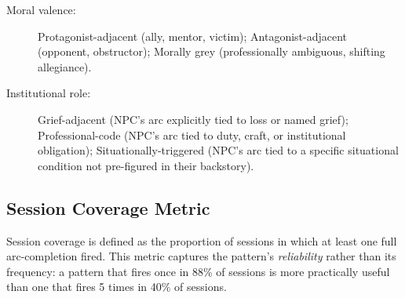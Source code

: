 \begin{description}
  \item[Moral valence:] Protagonist-adjacent (ally, mentor, victim); Antagonist-adjacent
    (opponent, obstructor); Morally grey (professionally ambiguous, shifting allegiance).
  \item[Institutional role:] Grief-adjacent (NPC's arc explicitly tied to loss or
    named grief); Professional-code (NPC's arc tied to duty, craft, or institutional
    obligation); Situationally-triggered (NPC's arc tied to a specific situational
    condition not pre-figured in their backstory).
\end{description}

\subsection{Session Coverage Metric}

Session coverage is defined as the proportion of sessions in which at least one
full arc-completion fired. This metric captures the pattern's \textit{reliability}
rather than its frequency: a pattern that fires once in 88\% of sessions is more
practically useful than one that fires 5 times in 40\% of sessions.
